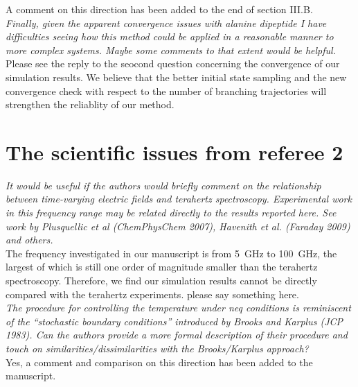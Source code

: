 \documentclass[]{revtex4-1}
\newcommand{\recheck}[1]{{\color{red} #1}}
\begin{document}
A comment on this direction has been added to the end of section III.B.
\\

\emph{Finally, given the apparent convergence issues with alanine
  dipeptide I have difficulties seeing how this method could be
  applied in a reasonable manner to more complex systems. Maybe some
  comments to that extent would be helpful.  }\\


Please see the reply to the seocond question concerning the convergence
of our simulation results. We believe that the better initial
state sampling and the new convergence check with respect to the
number of branching trajectories will strengthen the reliablity
of our method.






\section*{The scientific issues from referee 2}

\emph{
It would be useful if the authors would briefly comment on the
relationship between time-varying electric fields and terahertz
spectroscopy. Experimental work in this frequency range may be related
directly to the results reported here. See work by Plusquellic et al
(ChemPhysChem 2007), Havenith et al. (Faraday 2009) and others.
}\\

The frequency investigated in our manuscript is from 5~GHz to 100~GHz,
the largest of which is still one order of magnitude smaller than the
terahertz spectroscopy. Therefore, we find our simulation results
cannot be directly compared with the terahertz experiments.
\recheck{please say something here}.
\\

\emph{ The procedure for controlling the temperature under neq
  conditions is reminiscent of the ``stochastic boundary conditions''
  introduced by Brooks and Karplus (JCP 1983). Can the authors provide
  a more formal description of their procedure and touch on
  similarities/dissimilarities with the Brooks/Karplus approach?  }\\

Yes, a comment and comparison on this direction has been added to the
manuscript.\\
\end{document}

